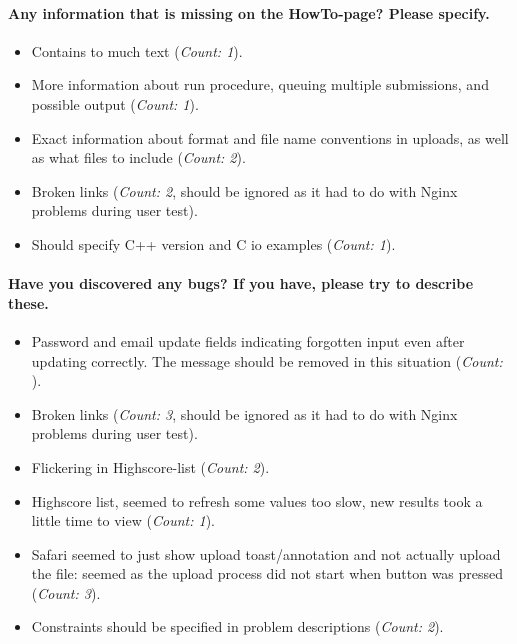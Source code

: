 \paragraph*{Any information that is missing on the HowTo-page? Please specify.} \hfill
\begin{itemize}
  \item Contains to much text (\textit{Count: 1}).
  \item More information about run procedure, queuing multiple submissions, and possible output (\textit{Count: 1}).
  \item Exact information about format and file name conventions in uploads, as well as what files to include (\textit{Count: 2}).
  \item Broken links (\textit{Count: 2}, should be ignored as it had to do with Nginx problems during user test).
  \item Should specify C++ version and C io examples (\textit{Count: 1}).
\end{itemize}

\paragraph*{Have you discovered any bugs? If you have, please try to describe these.} \hfill
\begin{itemize}
  \item Password and email update fields indicating forgotten input even after updating correctly. The message should be removed in this situation (\textit{Count: }).
  \item Broken links (\textit{Count: 3}, should be ignored as it had to do with Nginx problems during user test).
  \item Flickering in Highscore-list (\textit{Count: 2}).
  \item Highscore list, seemed to refresh some values too slow, new results took a little time to view (\textit{Count: 1}).
  \item Safari seemed to just show upload toast/annotation and not actually upload the file: seemed as the upload process did not start when button was pressed (\textit{Count: 3}).
  \item Constraints should be specified in problem descriptions (\textit{Count: 2}).
\end{itemize}

